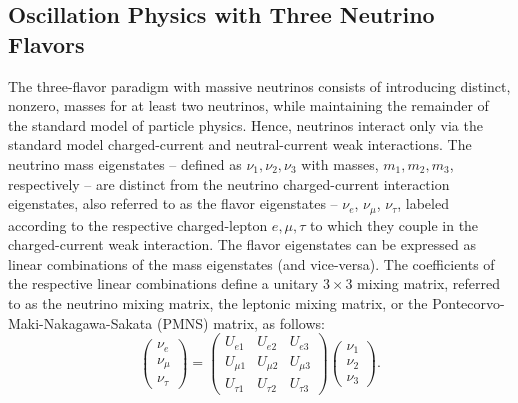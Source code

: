 \subsection{Oscillation Physics with Three Neutrino Flavors}

The three-flavor paradigm with massive neutrinos consists of introducing distinct, nonzero, masses for at least two neutrinos, while maintaining the remainder of the standard model of particle physics. Hence, neutrinos interact only via the standard model charged-current and neutral-current weak interactions. The neutrino mass eigenstates -- defined as $\nu_1,\nu_2, \nu_3$ with masses, $m_1, m_2, m_3$, respectively -- are distinct from the neutrino charged-current interaction eigenstates, also referred to as the flavor eigenstates -- $\nu_e$, $\nu_{\mu}$, $\nu_{\tau}$, labeled according to the respective charged-lepton $e,\mu,\tau$ to which they couple in the charged-current weak interaction. The flavor eigenstates can be expressed as linear combinations of the mass eigenstates (and vice-versa). The coefficients of the respective linear combinations define a unitary $3\times 3$ mixing matrix, referred to as the neutrino mixing matrix, the leptonic mixing matrix, or the Pontecorvo-Maki-Nakagawa-Sakata (PMNS) matrix, as follows:
\begin{equation}
\left(\begin{array}{c} \nu_e \\ \nu_{\mu} \\ \nu_{\tau} \end{array}\right) = \left(\begin{array}{ccc} U_{e1} & U_{e2} & U_{e3} \\  U_{\mu1} & U_{\mu2} & U_{\mu3}  \\  U_{\tau1} & U_{\tau2} & U_{\tau3}  \end{array}\right) \left(\begin{array}{c} \nu_1 \\ \nu_2 \\ \nu_3 \end{array}\right).
\end{equation}
